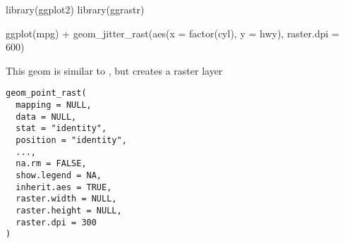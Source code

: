 \documentclass[a4paper]{book}
\begin{document}
%
\begin{Examples}
\begin{ExampleCode}
library(ggplot2)
library(ggrastr)

ggplot(mpg) + geom_jitter_rast(aes(x = factor(cyl), y = hwy), raster.dpi = 600)

\end{ExampleCode}
\end{Examples}
%
\begin{Description}\relax
This geom is similar to , but creates a raster layer
\end{Description}
%
\begin{Usage}
\begin{verbatim}
geom_point_rast(
  mapping = NULL,
  data = NULL,
  stat = "identity",
  position = "identity",
  ...,
  na.rm = FALSE,
  show.legend = NA,
  inherit.aes = TRUE,
  raster.width = NULL,
  raster.height = NULL,
  raster.dpi = 300
)
\end{verbatim}
\end{Usage}
%
\end{document}
